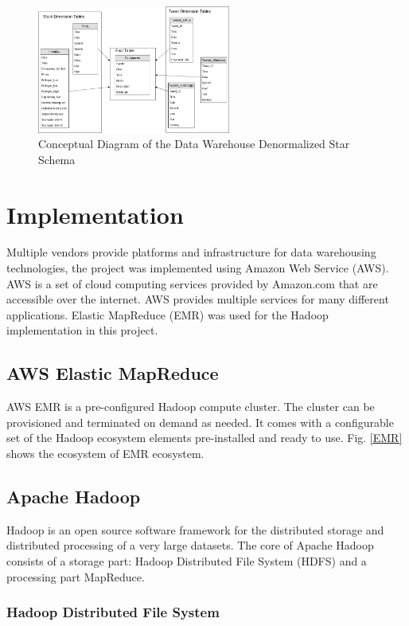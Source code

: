 \documentclass[journal]{IEEEtran}
\begin{document}
\begin{figure}
	\centering
	\includegraphics[width=2.5in]{Star_Conceptual_Schema.png}
	\caption{Conceptual Diagram of the Data Warehouse 
		Denormalized Star Schema}
	\label{star}
\end{figure}

\section{Implementation}

Multiple vendors provide platforms and infrastructure for data warehousing technologies, the project was implemented using Amazon Web Service (AWS).
AWS is a set of cloud computing services provided by Amazon.com that are accessible over the internet.
AWS provides multiple services for many different applications. 
Elastic MapReduce (EMR) was used for the Hadoop implementation in this project.

\subsection{AWS Elastic MapReduce}

AWS EMR is a pre-configured Hadoop compute cluster.
The cluster can be provisioned and terminated on demand as needed.
It comes with a configurable set of the Hadoop ecosystem elements pre-installed and ready to use.
Fig. \ref{EMR} shows the ecosystem of EMR ecosystem.

\subsection{Apache Hadoop}

Hadoop is an open source software framework for the distributed storage and distributed processing of a very large datasets. 
The core of Apache Hadoop consists of a storage part: Hadoop Distributed File System (HDFS) and a processing part MapReduce.

\subsubsection{Hadoop Distributed File System}
\end{document}
